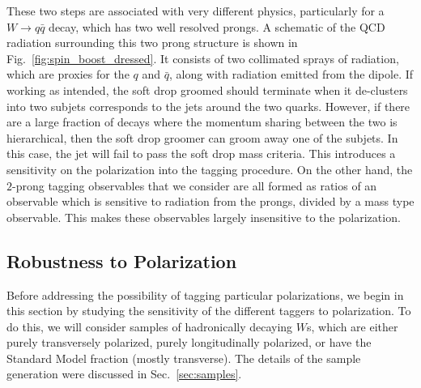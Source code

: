 \documentclass[11pt,letterpaper]{article}
\DeclareRobustCommand{\Sec}[1]{Sec.~\ref{#1}}
\DeclareRobustCommand{\Fig}[1]{Fig.~\ref{#1}}
\begin{document}
These two steps are associated with very different physics, particularly for a $W\to q\bar q$ decay, which has two well resolved prongs. A schematic of the QCD radiation surrounding this two prong structure is shown in \Fig{fig:spin_boost_dressed}. It consists of two collimated sprays of radiation, which are proxies for the $q$ and $\bar q$, along with radiation emitted from the dipole. If working as intended, the soft drop groomed should terminate when it de-clusters into two subjets corresponds to the jets around the two quarks. However, if there are a large fraction of decays where the momentum sharing between the two is hierarchical, then the soft drop groomer can groom away one of the subjets. In this case, the jet will fail to pass the soft drop mass criteria. This introduces a sensitivity on the polarization into the tagging procedure. On the other hand, the $2$-prong tagging observables that we consider are all formed as ratios of an observable which is sensitive to radiation from the prongs, divided by a mass type observable. This makes these observables largely insensitive to the polarization.

\subsection{Robustness to Polarization}\label{sec:polar_robust}


Before addressing the possibility of tagging particular polarizations, we begin in this section by studying the sensitivity of the different taggers to polarization. To do this, we will consider samples of hadronically decaying $W$s, which are either purely transversely polarized, purely longitudinally polarized, or have the Standard Model fraction (mostly transverse). The details of the sample generation were discussed in \Sec{sec:samples}.
\end{document}
